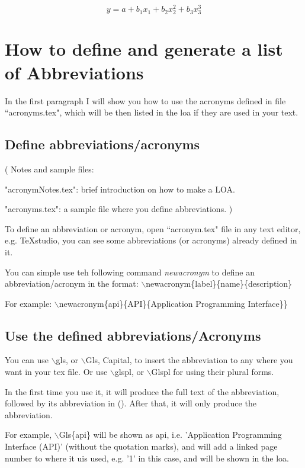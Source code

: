 \begin{equation*}
y = a + b_1x_1 + b_2x_2^2 + b_3x_3^3
\end{equation*}

\section{How to define and generate a list of Abbreviations}

In the first paragraph I will show you how to use the acronyms defined in file ``acronyms.tex", which will be then listed in the \gls{loa} if they are used in your text.

\subsection{Define abbreviations/acronyms}

( Notes and sample files:

 "acronymNotes.tex": brief introduction on how to make a LOA. 
 
 "acronyms.tex": a sample file where you define abbreviations.
)

To define an abbreviation or acronym, open ``acronym.tex" file in any text editor, e.g. TeXstudio, you can see some abbreviations (or acronyms) already defined in it.

You can simple use teh following command \emph{newacronym} to define an abbreviation/acronym 
in the format: $\backslash$newacronym\{label\}\{name\}\{description\}

For example:  
$\backslash$newacronym\{api\}\{API\}\{Application Programming Interface\}\} 
 
\subsection{Use the defined abbreviations/Acronyms}

You can use $\backslash$gls, or  $\backslash$Gls, Capital, to insert the abbreviation to any where you want in your tex file. 
Or use $\backslash$glspl, or  $\backslash$Glspl for using their plural forms. 

In the first time you use it, it will produce the full text of the abbreviation, followed by its abbreviation in (). After that, it will only produce the abbreviation.   

For example,      
$\backslash$Gls\{api\} 
 will be shown as \gls{api}, i.e. 'Application Programming Interface (API)' 
(without the quotation marks), 
and will add a linked page number to where it uis used, e.g. '1' in this case, and will be shown in the \gls{loa}. 


